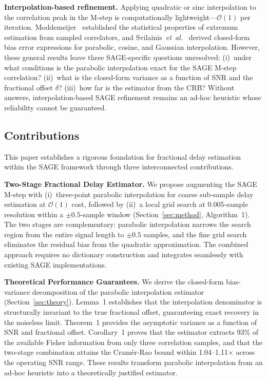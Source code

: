 \documentclass[journal]{IEEEtran}
\newcommand{\bigO}{\mathcal{O}}
\begin{document}
\textbf{Interpolation-based refinement.} Applying quadratic or sinc interpolation to the correlation peak in the M-step is computationally lightweight---$\bigO(1)$ per iteration. Moddemeijer~\cite{moddemeijer1991} established the statistical properties of extremum estimation from sampled correlators, and Svilainis~\textit{et~al.}~\cite{svilainis2013} derived closed-form bias error expressions for parabolic, cosine, and Gaussian interpolation. However, these general results leave three SAGE-specific questions unresolved: (i)~under what conditions is the parabolic interpolation exact for the SAGE M-step correlation? (ii)~what is the closed-form variance as a function of SNR and the fractional offset $\delta$? (iii)~how far is the estimator from the CRB? Without answers, interpolation-based SAGE refinement remains an ad-hoc heuristic whose reliability cannot be guaranteed.

\subsection{Contributions}

This paper establishes a rigorous foundation for fractional delay estimation within the SAGE framework through three interconnected contributions.

\noindent\textbf{Two-Stage Fractional Delay Estimator.} We propose augmenting the SAGE M-step with (i)~three-point parabolic interpolation for coarse sub-sample delay estimation at $\bigO(1)$ cost, followed by (ii)~a local grid search at 0.005-sample resolution within a $\pm 0.5$-sample window (Section~\ref{sec:method}, Algorithm~1). The two stages are complementary: parabolic interpolation narrows the search region from the entire signal length to $\pm 0.5$ samples, and the fine grid search eliminates the residual bias from the quadratic approximation. The combined approach requires no dictionary construction and integrates seamlessly with existing SAGE implementations.

\noindent\textbf{Theoretical Performance Guarantees.} We derive the closed-form bias-variance decomposition of the parabolic interpolation estimator (Section~\ref{sec:theory}). Lemma~1 establishes that the interpolation denominator is structurally invariant to the true fractional offset, guaranteeing exact recovery in the noiseless limit. Theorem~1 provides the asymptotic variance as a function of SNR and fractional offset. Corollary~1 proves that the estimator extracts 93\% of the available Fisher information from only three correlation samples, and that the two-stage combination attains the Cram\'{e}r-Rao bound within 1.04--1.11$\times$ across the operating SNR range. These results transform parabolic interpolation from an ad-hoc heuristic into a theoretically justified estimator.
\end{document}
